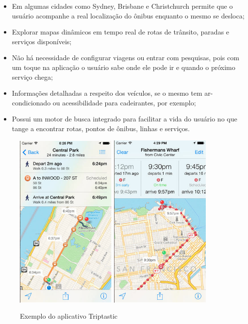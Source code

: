 \begin{itemize}
\item Em algumas cidades como  Sydney, Brisbane e Christchurch permite que o usuário acompanhe a real localização do ônibus enquanto o mesmo se desloca;
\item Explorar mapas dinâmicos em tempo real de rotas de trânsito, paradas e serviços disponíveis;
\item Não há necessidade de configurar viagens ou entrar com  pesquisas, pois com um toque na aplicação o usuário sabe onde ele pode ir e quando o próximo serviço chega;
\item Informações detalhadas a respeito dos veículos, se o mesmo tem ar-condicionado ou acessibilidade para cadeirantes, por exemplo;
\item Possui um motor de busca integrado para facilitar  a vida do usuário no que tange a encontrar rotas, pontos de ônibus, linhas e serviços. 
\end{itemize}

\begin{figure}[htp]
\begin{center}
  \includegraphics[width=5cm]{images/app1.png}
    \includegraphics[width=5cm]{images/app2.png}
  \caption{Exemplo do aplicativo Triptastic}
  \label{fig:exampleTriptastic}
\end{center}
\end{figure}


